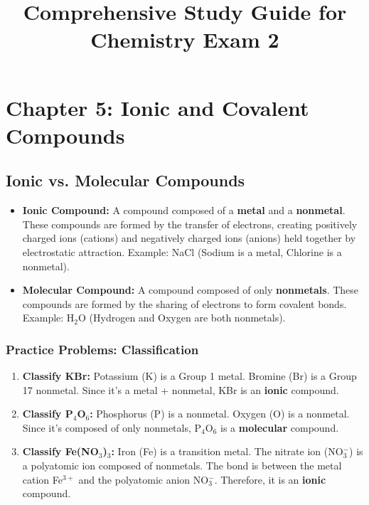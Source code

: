 \documentclass{article}
\title{Comprehensive Study Guide for Chemistry Exam 2}
\author{} %
\date{}
\begin{document}
\maketitle %

\section*{Chapter 5: Ionic and Covalent Compounds}

\subsection*{Ionic vs. Molecular Compounds}
\begin{itemize}[itemsep=5pt]
    \item \textbf{Ionic Compound:} A compound composed of a \textbf{metal} and a \textbf{nonmetal}. These compounds are formed by the transfer of electrons, creating positively charged ions (cations) and negatively charged ions (anions) held together by electrostatic attraction. Example: NaCl (Sodium is a metal, Chlorine is a nonmetal).
    \item \textbf{Molecular Compound:} A compound composed of only \textbf{nonmetals}. These compounds are formed by the sharing of electrons to form covalent bonds. Example: H\(_2\)O (Hydrogen and Oxygen are both nonmetals).
\end{itemize}

\subsubsection*{Practice Problems: Classification}
\begin{enumerate}[itemsep=5pt]
    \item \textbf{Classify KBr:} Potassium (K) is a Group 1 metal. Bromine (Br) is a Group 17 nonmetal. Since it's a metal + nonmetal, KBr is an \textbf{ionic} compound.
    \item \textbf{Classify P\(_4\)O\(_6\):} Phosphorus (P) is a nonmetal. Oxygen (O) is a nonmetal. Since it's composed of only nonmetals, P\(_4\)O\(_6\) is a \textbf{molecular} compound.
    \item \textbf{Classify Fe(NO\(_3\))\(_3\):} Iron (Fe) is a transition metal. The nitrate ion (NO\(_3^-\)) is a polyatomic ion composed of nonmetals. The bond is between the metal cation Fe\(^{3+}\) and the polyatomic anion NO\(_3^-\). Therefore, it is an \textbf{ionic} compound.
\end{enumerate}
\end{document}
